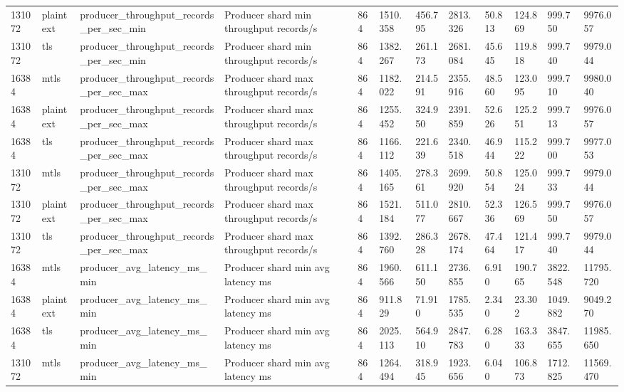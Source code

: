 \begin{longtable}{llllllllllll}
131072 & plaintext & producer\_throughput\_records\_per\_sec\_min & Producer shard min throughput records/s & 864 & 1510.358 & 456.795 & 2813.326 & 50.813 & 124.869 & 999.750 & 9976.057 \\
131072 & tls & producer\_throughput\_records\_per\_sec\_min & Producer shard min throughput records/s & 864 & 1382.267 & 261.173 & 2681.084 & 45.645 & 119.818 & 999.740 & 9979.044 \\
16384 & mtls & producer\_throughput\_records\_per\_sec\_max & Producer shard max throughput records/s & 864 & 1182.022 & 214.591 & 2355.916 & 48.560 & 123.095 & 999.710 & 9980.040 \\
16384 & plaintext & producer\_throughput\_records\_per\_sec\_max & Producer shard max throughput records/s & 864 & 1255.452 & 324.950 & 2391.859 & 52.626 & 125.251 & 999.713 & 9976.057 \\
16384 & tls & producer\_throughput\_records\_per\_sec\_max & Producer shard max throughput records/s & 864 & 1166.112 & 221.639 & 2340.518 & 46.944 & 115.222 & 999.700 & 9977.053 \\
131072 & mtls & producer\_throughput\_records\_per\_sec\_max & Producer shard max throughput records/s & 864 & 1405.165 & 278.361 & 2699.920 & 50.854 & 125.024 & 999.733 & 9979.044 \\
131072 & plaintext & producer\_throughput\_records\_per\_sec\_max & Producer shard max throughput records/s & 864 & 1521.184 & 511.077 & 2810.667 & 52.336 & 126.569 & 999.750 & 9976.057 \\
131072 & tls & producer\_throughput\_records\_per\_sec\_max & Producer shard max throughput records/s & 864 & 1392.760 & 286.328 & 2678.174 & 47.464 & 121.417 & 999.740 & 9979.044 \\
16384 & mtls & producer\_avg\_latency\_ms\_min & Producer shard min avg latency ms & 864 & 1960.566 & 611.150 & 2736.855 & 6.910 & 190.765 & 3822.548 & 11795.720 \\
16384 & plaintext & producer\_avg\_latency\_ms\_min & Producer shard min avg latency ms & 864 & 911.829 & 71.910 & 1785.535 & 2.340 & 23.302 & 1049.882 & 9049.270 \\
16384 & tls & producer\_avg\_latency\_ms\_min & Producer shard min avg latency ms & 864 & 2025.113 & 564.910 & 2847.783 & 6.280 & 163.333 & 3847.655 & 11985.650 \\
131072 & mtls & producer\_avg\_latency\_ms\_min & Producer shard min avg latency ms & 864 & 1264.494 & 318.945 & 1923.656 & 6.040 & 106.873 & 1712.825 & 11569.470 \\

\end{longtable}
